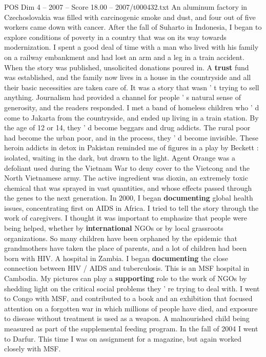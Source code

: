 \begin{textsample}{POS Dim 4 – 2007 – Score 18.00 – 2007/t000432.txt}
An aluminum factory in Czechoslovakia was filled with carcinogenic smoke and dust, and four out of five workers came down with cancer.
After the fall of Suharto in Indonesia, I began to explore conditions of poverty in a country that was on its way towards modernization.
I spent a good deal of time with a man who lived with his family on a railway embankment and had lost an arm and a leg in a train accident.
When the story was published, unsolicited donations poured in.
A \textbf{trust} fund was established, and the family now lives in a house in the countryside and all their basic necessities are taken care of.
It was a story that wasn ' t trying to sell anything.
Journalism had provided a channel for people ' s natural sense of generosity, and the readers responded.
I met a band of homeless children who ' d come to Jakarta from the countryside, and ended up living in a train station.
By the age of 12 or 14, they ' d become beggars and drug addicts.
The rural poor had become the urban poor, and in the process, they ' d become invisible.
These heroin addicts in detox in Pakistan reminded me of figures in a play by Beckett : isolated, waiting in the dark, but drawn to the light.
Agent Orange was a defoliant used during the Vietnam War to deny cover to the Vietcong and the North Vietnamese army.
The active ingredient was dioxin, an extremely toxic chemical that was sprayed in vast quantities, and whose effects passed through the genes to the next generation.
In 2000, I began \textbf{documenting} global health issues, concentrating first on AIDS in Africa.
I tried to tell the story through the work of caregivers.
I thought it was important to emphasize that people were being helped, whether by \textbf{international} NGOs or by local grassroots organizations.
So many children have been orphaned by the epidemic that grandmothers have taken the place of parents, and a lot of children had been born with HIV.
A hospital in Zambia.
I began \textbf{documenting} the close connection between HIV / AIDS and tuberculosis.
This is an MSF hospital in Cambodia.
My pictures can play a \textbf{supporting} role to the work of NGOs by shedding light on the critical social problems they ' re trying to deal with.
I went to Congo with MSF, and contributed to a book and an exhibition that focused attention on a forgotten war in which millions of people have died, and exposure to disease without treatment is used as a weapon.
A malnourished child being measured as part of the supplemental feeding program.
In the fall of 2004 I went to Darfur.
This time I was on assignment for a magazine, but again worked closely with MSF.

\end{textsample}
